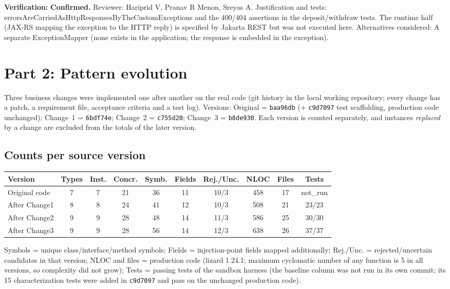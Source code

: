 \documentclass[11pt,a4paper]{article}
\begin{document}
\textbf{Verification:} \textbf{Confirmed.} Reviewer: Hariprid V, Pranav R Menon, Sreyas A. Justification and tests: errorsAreCarriedAsHttpResponsesByTheCustomExceptions and the 400/404 assertions in the deposit/withdraw tests. The runtime half (JAX-RS mapping the exception to the HTTP reply) is specified by Jakarta REST but was not executed here. Alternatives considered: A separate ExceptionMapper (none exists in the application; the response is embedded in the exception).
\section{Part 2: Pattern evolution}
Three business changes were implemented one after another on the real code (git history in the local working repository; every change has a patch, a requirement file, acceptance criteria and a test log). Versions: Original = \texttt{baa96db} (+ \texttt{c9d7097} test scaffolding, production code unchanged); Change~1 = \texttt{6bdf74e}; Change~2 = \texttt{c755d20}; Change~3 = \texttt{b8de930}. Each version is counted separately, and instances \emph{replaced} by a change are excluded from the totals of the later version.
\subsection{Counts per source version}
{\footnotesize
\begin{center}\begin{tabular}{@{}p{2.7cm}ccccccccc@{}}
\toprule \textbf{Version} & \textbf{Types} & \textbf{Inst.} & \textbf{Concr.} & \textbf{Symb.} & \textbf{Fields} & \textbf{Rej./Unc.} & \textbf{NLOC} & \textbf{Files} & \textbf{Tests} \\ \midrule
Original code & 7 & 7 & 21 & 36 & 11 & 10/3 & 458 & 17 & not\_run \\
After Change1 & 8 & 8 & 24 & 41 & 12 & 10/3 & 508 & 21 & 23/23 \\
After Change2 & 9 & 9 & 28 & 48 & 14 & 11/3 & 586 & 25 & 30/30 \\
After Change3 & 9 & 9 & 28 & 56 & 14 & 12/3 & 638 & 26 & 37/37 \\
\bottomrule\end{tabular}\end{center}
}
Symbols = unique class/interface/method symbols; Fields = injection-point fields mapped additionally; Rej./Unc. = rejected/uncertain candidates in that version; NLOC and files = production code (lizard 1.24.1; maximum cyclomatic number of any function is 5 in all versions, so complexity did not grow); Tests = passing tests of the sandbox harness (the baseline column was not run in its own commit; its 15 characterization tests were added in \texttt{c9d7097} and pass on the unchanged production code).
\end{document}
